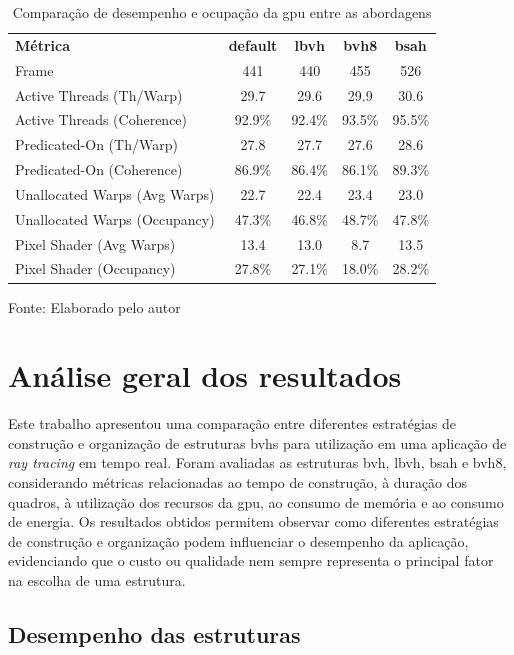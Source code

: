 \begin{table}[ht]
\centering
\caption{Comparação de desempenho e ocupação da \gls{gpu} entre as abordagens}
\label{tab:comparacaoAlgoritmos}
\begin{tabularx}{\textwidth}{@{} X c c c c @{}}
\toprule
\textbf{Métrica} & \textbf{default} & \textbf{lbvh} & \textbf{bvh8} & \textbf{bsah} \\
Frame & 441 & 440 & 455 & 526 \\
Active Threads (Th/Warp) & 29.7 & 29.6 & 29.9 & 30.6 \\
Active Threads (Coherence) & 92.9\% & 92.4\% & 93.5\% & 95.5\% \\
Predicated-On (Th/Warp) & 27.8 & 27.7 & 27.6 & 28.6 \\
Predicated-On (Coherence) & 86.9\% & 86.4\% & 86.1\% & 89.3\% \\
Unallocated Warps (Avg Warps) & 22.7 & 22.4 & 23.4 & 23.0 \\
Unallocated Warps (Occupancy) & 47.3\% & 46.8\% & 48.7\% & 47.8\% \\
Pixel Shader (Avg Warps) & 13.4 & 13.0 & 8.7 & 13.5 \\
Pixel Shader (Occupancy) & 27.8\% & 27.1\% & 18.0\% & 28.2\% \\ \bottomrule
\end{tabularx}
\centering \footnotesize Fonte: Elaborado pelo autor
\end{table}

\FloatBarrier

\section{Análise geral dos resultados}

Este trabalho apresentou uma comparação entre diferentes estratégias de construção e organização de estruturas \glspl{bvh} para utilização em uma aplicação de \textit{ray tracing} em tempo real. Foram avaliadas as estruturas \gls{bvh}, \gls{lbvh}, \gls{bsah} e \gls{bvh8}, considerando métricas relacionadas ao tempo de construção, à duração dos quadros, à utilização dos recursos da \gls{gpu}, ao consumo de memória e ao consumo de energia. Os resultados obtidos permitem observar como diferentes estratégias de construção e organização podem influenciar o desempenho da aplicação, evidenciando que o custo ou qualidade nem sempre representa o principal fator na escolha de uma estrutura.

\subsection{Desempenho das estruturas}

